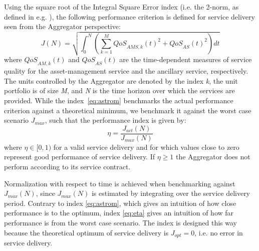 	Using the square root of the Integral Square Error index (i.e. the 2-norm, as defined in e.g. \cite{Skogestad}), the following performance criterion is defined for service delivery seen from the Aggregator perspective:
	\begin{equation}
		{J}(N)=\sqrt{\int_{0}^{N}\left( \sum_{k=1}^M {QoS}_{AMS,k}(t)^{2}+{QoS}_{AS}(t)^{2}\right)dt} 
	\end{equation}
where ${QoS}_{AM,k}(t)$ and ${QoS}_{AS}(t)$ are the time-dependent measures of service quality for the asset-management service and the ancillary service, respectively. The units controlled by the Aggregator are denoted by the index \emph{k}, the unit portfolio is of size \emph{M}, and \emph{N} is the time horizon over which the services are provided. %
While the index~\eqref{eq:astrom} benchmarks the actual performance criterion against a theoretical minimum, we benchmark it against the worst case scenario $J_{max}$, such that the performance index is given by:
	\begin{equation} 
		\eta = \frac{J_{act}(N)}{J_{max}(N)}\label{eq:eta}
	\end{equation}
	where $\eta \in [0,1)$ for a valid service delivery and for which values close to zero represent good performance of service delivery. If $\eta \geq 1$ the Aggregator does not perform according to its service contract.
		
		Normalization with respect to time is achieved when benchmarking against $J_{max}(N)$, since $J_{max}(N)$ is estimated by integrating over the service delivery period. Contrary to index \eqref{eq:astrom}, which gives an intuition of how close performance is to the optimum, index \eqref{eq:eta} gives an intuition of how far performance is from the worst case scenario. The index is designed this way because the theoretical optimum of service delivery is $J_{opt}=0$, i.e. no error in service delivery.
